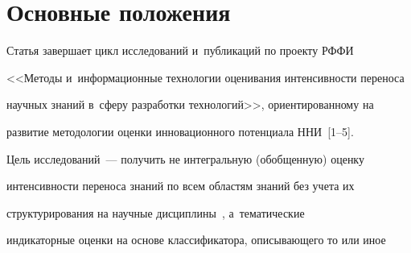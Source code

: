       























      \thispagestyle{headings}


      




     


     \vspace*{-12pt}


      


\section{Основные положения}


      


     Статья завершает цикл исследований и~публикаций по проекту РФФИ 


<<Методы и~информационные технологии оценивания интенсивности переноса 


научных знаний в~сферу разработки технологий>>, ориентированному на 


развитие методологии оценки инновационного потенциала ННИ~[1--5]. 


     


     Цель исследований~--- получить не интегральную (обобщенную) оценку 


интенсивности переноса знаний по всем областям знаний без учета их 


структурирования на научные дисциплины~\cite{2-mins}, а~тематические 


индикаторные оценки на основе классификатора, описывающего то или иное 


